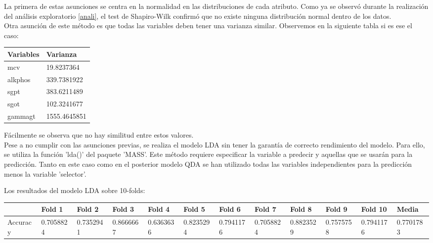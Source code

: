 La primera de estas asunciones se centra en la normalidad en las distribuciones de cada atributo. Como ya se observó durante la realización del análisis exploratorio \ref{anali}, el test de Shapiro-Wilk confirmó que no existe ninguna distribución normal dentro de los datos. \\

Otra asunción de este método es que todas las variables deben tener una varianza similar. Observemos en la siguiente tabla si es ese el caso:
\begin{table}[!h]
	\centering
	\begin{tabular}{l|l}
		Variables & Varianza     \\ \hline
		mcv       & 19.8237364   \\
		alkphos   & 339.7381922  \\
		sgpt      & 383.6211489  \\
		sgot      & 102.3241677  \\
		gammagt   & 1555.4645851
	\end{tabular}
\end{table}

Fácilmente se observa que no hay similitud entre estos valores.\\

Pese a no cumplir con las asunciones previas, se realiza el modelo LDA sin tener la garantía de correcto rendimiento del modelo. Para ello, se utiliza la función 'lda()' del paquete 'MASS'. Este método requiere especificar la variable a predecir y aquellas que se usarán para la predicción. Tanto en este caso como en el posterior modelo QDA se han utilizado todas las variables independientes para la predicción menos la variable 'selector'.

\newpage
Los resultados del modelo LDA sobre 10-folds:

\begin{table}[!h]
	\resizebox{15cm}{!} {
	\begin{tabular}{l|lllllllllll}
		& Fold 1    & Fold 2    & Fold 3    & Fold 4    & Fold 5    & Fold 6    & Fold 7    & Fold 8    & Fold 9    & Fold 10   & Media     \\ \hline
		Accuracy & 0.7058824 & 0.7352941 & 0.8666667 & 0.6363636 & 0.8235294 & 0.7941176 & 0.7058824 & 0.8823529 & 0.7575758 & 0.7941176 & 0.7701783
	\end{tabular}
}
\end{table}










